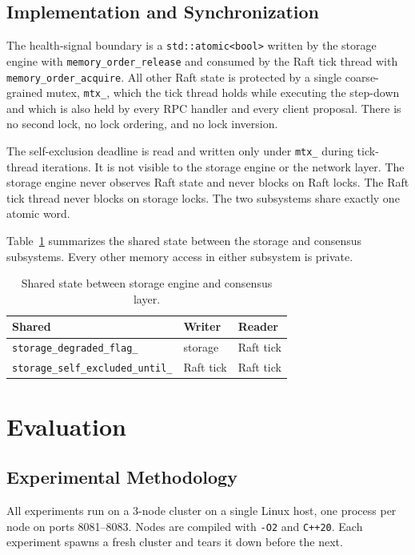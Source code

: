 \documentclass[conference, a4paper]{IEEEtran}
\begin{document}
\subsection{Implementation and Synchronization}

The health-signal boundary is a \texttt{std::atomic<bool>} written by
the storage engine with \texttt{memory\_order\_release} and consumed by
the Raft tick thread with \texttt{memory\_order\_acquire}. All other
Raft state is protected by a single coarse-grained mutex,
\texttt{mtx\_}, which the tick thread holds while executing the
step-down and which is also held by every RPC handler and every client
proposal. There is no second lock, no lock ordering, and no lock
inversion.

The self-exclusion deadline is read and written only under \texttt{mtx\_}
during tick-thread iterations. It is not visible to the storage engine
or the network layer. The storage engine never observes Raft state and
never blocks on Raft locks. The Raft tick thread never blocks on storage
locks. The two subsystems share exactly one atomic word.

Table~\ref{tab:shared} summarizes the shared state between the storage
and consensus subsystems. Every other memory access in either subsystem
is private.

\begin{table}[h]
\centering
\caption{Shared state between storage engine and consensus layer.}
\label{tab:shared}
\small
\begin{tabular}{l l l}
\toprule
\textbf{Shared} & \textbf{Writer} & \textbf{Reader} \\
\midrule
\texttt{storage\_degraded\_flag\_} & storage & Raft tick \\
\texttt{storage\_self\_excluded\_until\_} & Raft tick & Raft tick \\
\bottomrule
\end{tabular}
\end{table}

\section{Evaluation}

\subsection{Experimental Methodology}

All experiments run on a 3-node cluster on a single Linux host, one
process per node on ports 8081--8083. Nodes are compiled with
\texttt{-O2} and \texttt{C++20}. Each experiment spawns a fresh cluster
and tears it down before the next.
\end{document}
